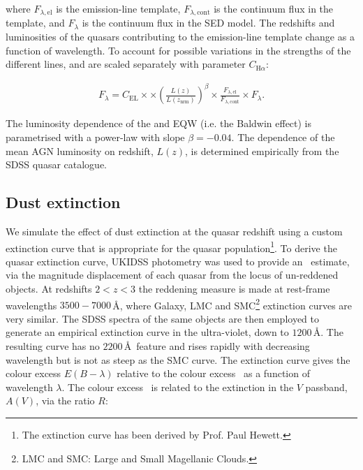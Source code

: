 \noindent where $F_{\lambda, \text{el}}$ is the emission-line template, $F_{\lambda,\text{cont}}$ is the continuum flux in the template, and $F_{\lambda}$ is the continuum flux in the SED model.
The redshifts and luminosities of the quasars contributing to the emission-line template change as a function of wavelength. 
To account for possible variations in the strengths of the different lines, \ha and \hb are scaled separately with parameter $C_{{\text{H}} \alpha}$: 

\begingroup\makeatletter{}\check@mathfonts
\begin{eqnarray}
  F_{\lambda} =  C_{\text{EL}} \times  \times \left( \frac{L(z)} {L(z_{\text{nrm}})} \right)^{\beta} \times \frac{F_{\lambda, \text{el}}}{F_{\lambda, \text{cont}}} \times F_{\lambda}.
\end{eqnarray}
\endgroup

\noindent The luminosity dependence of the \ha and \hb EQW (i.e. the Baldwin effect) is parametrised with a power-law with slope $\beta=-0.04$.
The dependence of the mean AGN luminosity on redshift, $L(z)$, is determined empirically from the SDSS quasar catalogue. 

\subsection{Dust extinction}
\label{sec:sed-extinction} 

We simulate the effect of dust extinction at the quasar redshift using a custom extinction curve that is appropriate for the quasar population\footnote{The extinction curve has been derived by Prof. Paul Hewett.}.
To derive the quasar extinction curve, UKIDSS photometry was used to provide an \ebv\, estimate, via the magnitude displacement of each quasar from the locus of un-reddened objects. 
At redshifts $2 < z < 3$ the reddening measure is made at rest-frame wavelengths $3500-7000$\,\AA, where Galaxy, LMC and SMC\footnote{LMC and SMC: Large and Small Magellanic Clouds.} extinction curves are very similar. 
The SDSS spectra of the same objects are then employed to generate an empirical extinction curve in the ultra-violet, down to $1200$\,\AA. 
The resulting curve has no $2200$\,\AA\, feature and rises rapidly with decreasing wavelength but is not as steep as the SMC curve. 
The extinction curve gives the colour excess $E(B-\lambda)$ relative to the colour excess \ebv\, as a function of wavelength $\lambda$. 
The colour excess \ebv\, is related to the extinction in the $V$ passband, $A(V)$, via the ratio $R$: 

